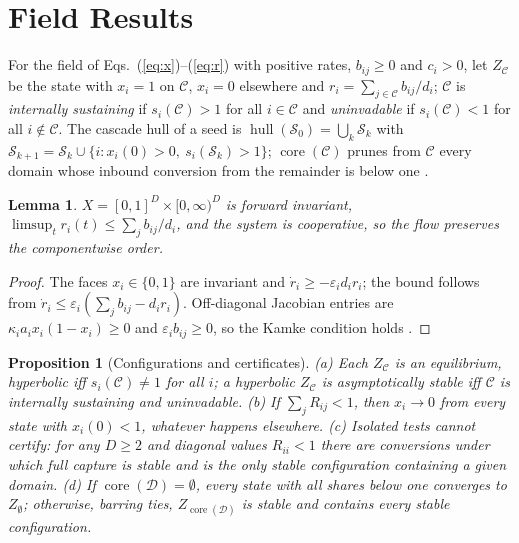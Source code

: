 \documentclass[letterpaper]{article} %
\newtheorem{proposition}{Proposition}
\newtheorem{lemma}{Lemma}
\theoremstyle{definition}
\newcommand{\hull}{\operatorname{hull}}
\newcommand{\core}{\operatorname{core}}
\newcommand{\cC}{\mathcal{C}}
\newcommand{\cS}{\mathcal{S}}
\newcommand{\cD}{\mathcal{D}}
\begin{document}
\section{Field Results}\label{app:field}

For the field of Eqs.~(\ref{eq:x})--(\ref{eq:r}) with positive rates, $b_{ij}\ge0$ and $c_i>0$, let $Z_\cC$ be the state with $x_i=1$ on $\cC$, $x_i=0$ elsewhere and $r_i=\sum_{j\in\cC}b_{ij}/d_i$; $\cC$ is \emph{internally sustaining} if $s_i(\cC)>1$ for all $i\in\cC$ and \emph{uninvadable} if $s_i(\cC)<1$ for all $i\notin\cC$. The cascade hull of a seed is $\hull(\cS_0)=\bigcup_k\cS_k$ with $\cS_{k+1}=\cS_k\cup\{i:x_i(0)>0,\ s_i(\cS_k)>1\}$; $\core(\cC)$ prunes from $\cC$ every domain whose inbound conversion from the remainder is below one \citep{kempe2003,morris2000,seidman1983}.

\begin{lemma}\label{lem:basic}
$X=[0,1]^D\times[0,\infty)^D$ is forward invariant, $\limsup_tr_i(t)\le\sum_jb_{ij}/d_i$, and the system is cooperative, so the flow preserves the componentwise order.
\end{lemma}
\begin{proof}
The faces $x_i\in\{0,1\}$ are invariant and $\dot r_i\ge-\varepsilon_id_ir_i$; the bound follows from $\dot r_i\le\varepsilon_i(\sum_jb_{ij}-d_ir_i)$. Off-diagonal Jacobian entries are $\kappa_ia_ix_i(1-x_i)\ge0$ and $\varepsilon_ib_{ij}\ge0$, so the Kamke condition holds \citep{smith1995}.
\end{proof}

\begin{proposition}[Configurations and certificates]\label{prop:cert}
(a) Each $Z_\cC$ is an equilibrium, hyperbolic iff $s_i(\cC)\neq1$ for all $i$; a hyperbolic $Z_\cC$ is asymptotically stable iff $\cC$ is internally sustaining and uninvadable. (b) If $\sum_jR_{ij}<1$, then $x_i\to0$ from every state with $x_i(0)<1$, whatever happens elsewhere. (c) Isolated tests cannot certify: for any $D\ge2$ and diagonal values $R_{ii}<1$ there are conversions under which full capture is stable and is the only stable configuration containing a given domain. (d) If $\core(\cD)=\emptyset$, every state with all shares below one converges to $Z_\emptyset$; otherwise, barring ties, $Z_{\core(\cD)}$ is stable and contains every stable configuration.
\end{proposition}
\end{document}
